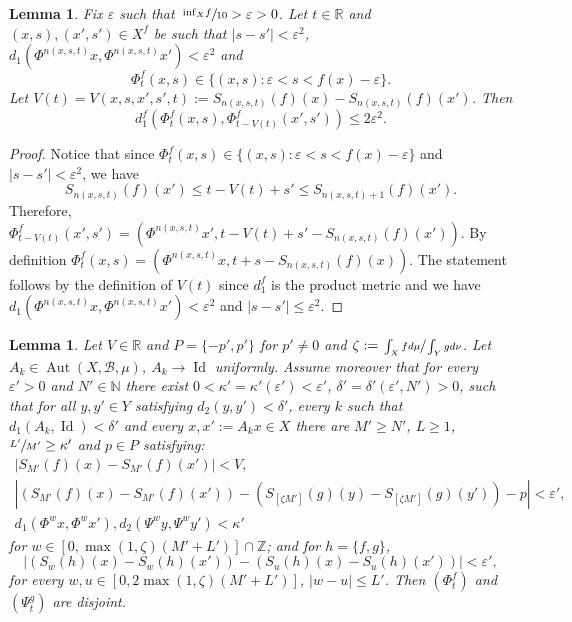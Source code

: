 \documentclass[10pt]{amsart}
\let\mathcal\mathscr
\let\epsilon\varepsilon
\DeclareMathOperator{\Aut}{Aut}
\DeclareMathOperator{\Id}{Id}
\theoremstyle{definition}
\theoremstyle{plain}
\newtheorem{lemma}[definition]{Lemma}
\newcommand\NN{\mathbb{N}}
\newcommand\RR{\mathbb{R}}
\newcommand\ZZ{\mathbb{Z}}
\newcommand\cB{\mathcal{B}}
\begin{document}
\begin{lemma}\label{lem:bew} Fix $\epsilon$ such that $\sfrac{\inf_X\!f}{10}>\epsilon>0$. Let $t\in \RR$ and $(x,s),(x',s')\in X^f$ be such that $|s-s'|<\epsilon^2$, $d_1(\Phi^{n(x,s,t)}x,\Phi^{n(x,s,t)}x')<\epsilon^2$ and
\[
\Phi_t^f(x,s)\in \{(x,s): \epsilon<s<f(x)-\epsilon\}.
\]
Let $V(t)=V(x,s,x',s', t):=S_{n(x,s,t)}(f)(x)-S_{n(x,s,t)}(f)(x')$. Then
\[
d_1^f(\Phi_t^f(x,s),\Phi_{t-V(t)}^f(x',s'))\leq 2\epsilon^2.
\]
\end{lemma}
\begin{proof}Notice that since $\Phi_t^f(x,s)\in \{(x,s): \epsilon<s<f(x)-\epsilon\}$ and $|s-s'|<\epsilon^2$, we have
\[
S_{n(x,s,t)}(f)(x')\leq t-V(t)+s' \leq S_{n(x,s,t)+1}(f)(x').
\]
Therefore, $\Phi_{t-V(t)}^f(x',s')=(\Phi^{n(x,s,t)}x',t-V(t)+s'-S_{n(x,s,t)}(f)(x'))$. By definition $\Phi_{t}^f(x,s)=(\Phi^{n(x,s,t)}x,t+s-S_{n(x,s,t)}(f)(x))$. The statement follows by the definition of $V(t)$ since $d_1^f$ is the product metric and we have $d_1(\Phi^{n(x,s,t)}x,\Phi^{n(x,s,t)}x')<\epsilon^2$ and $|s-s'|\leq\epsilon^2$.
\end{proof}

\begin{lemma}\label{cocycle} Let $V\in \RR$ and $P=\{-p',p'\}$ for $p'\neq 0$ and
$\zeta:=\sfrac{\int_Xf d\mu}{\int_Yg d\nu}$. Let $A_k\in \Aut(X,\cB,\mu)$,
$A_k\to \Id$ uniformly. Assume moreover that for every $\epsilon'>0$ and $N'\in \NN$ there exist $0<\kappa'=\kappa'(\epsilon')<\epsilon'$, $\delta'=\delta'(\epsilon',N')>0$, such that for all $y,y'\in Y$ satisfying $d_2(y,y')<\delta'$, every $k$ such that $d_1(A_k,\Id)<\delta'$ and every $x,x':=A_{k}x\in X$ there are $M'\geq N'$, $L\geq 1$, $\sfrac{L'}{M'}\geq \kappa'$ and $p\in P$ satisfying:
\begin{gather}\label{eq.bounded}
|S_{M'}(f)(x)-S_{M'}(f)(x')|<V,
\\
\label{forw.coc}
|(S_{M'}(f)(x)-S_{M'}(f)(x'))-(S_{[\zeta M']}(g)(y)-S_{[\zeta M']}(g)(y'))-p|<\epsilon',
\\
\label{base:close}
d_1(\Phi^wx,\Phi^wx'), d_2(\Psi^wy,\Psi^wy')<\kappa'
\end{gather}
for $w\in [0,\max(1,\zeta)(M'+L')]\cap \ZZ$; and for $h=\{f,g\}$,
\begin{equation}\label{forw.tight}
|(S_w(h)(x)-S_w(h)(x'))-(S_u(h)(x)-S_u(h)(x'))|<\epsilon',
\end{equation}
for every $w,u\in[0,2\max(1,\zeta) (M'+L')]$, $|w-u|\leq L'$.
Then $(\Phi_t^f)$ and $(\Psi_t^g)$ are disjoint.
\end{lemma}
\end{document}
